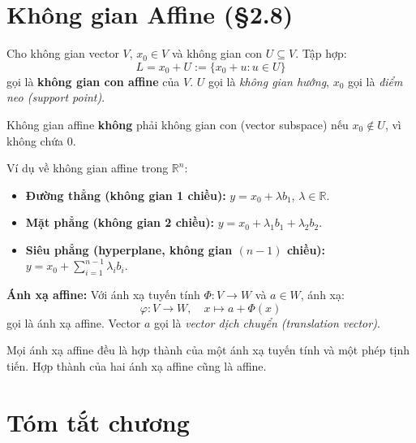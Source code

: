 \documentclass[12pt,a4paper]{article}
\begin{document}
\section{Không gian Affine (§2.8)}

\begin{dinhnghia}
Cho không gian vector $V$, $x_0 \in V$ và không gian con $U \subseteq V$. Tập hợp:
\[
  L = x_0 + U := \{x_0 + u : u \in U\}
\]
gọi là \textbf{không gian con affine} của $V$. $U$ gọi là \emph{không gian hướng}, $x_0$ gọi là \emph{điểm neo (support point)}.
\end{dinhnghia}

\begin{luuy}
Không gian affine \textbf{không} phải không gian con (vector subspace) nếu $x_0 \notin U$, vì không chứa $0$.
\end{luuy}

Ví dụ về không gian affine trong $\mathbb{R}^n$:
\begin{itemize}
  \item \textbf{Đường thẳng (không gian 1 chiều):} $y = x_0 + \lambda b_1$, $\lambda \in \mathbb{R}$.
  \item \textbf{Mặt phẳng (không gian 2 chiều):} $y = x_0 + \lambda_1 b_1 + \lambda_2 b_2$.
  \item \textbf{Siêu phẳng (hyperplane, không gian $(n-1)$ chiều):} $y = x_0 + \sum_{i=1}^{n-1} \lambda_i b_i$.
\end{itemize}

\begin{dinhnghia}
\textbf{Ánh xạ affine:} Với ánh xạ tuyến tính $\Phi : V \to W$ và $a \in W$, ánh xạ:
\[
  \varphi : V \to W,\quad x \mapsto a + \Phi(x)
\]
gọi là ánh xạ affine. Vector $a$ gọi là \emph{vector dịch chuyển (translation vector)}.
\end{dinhnghia}

\begin{luuy}
Mọi ánh xạ affine đều là hợp thành của một ánh xạ tuyến tính và một phép tịnh tiến. Hợp thành của hai ánh xạ affine cũng là affine.
\end{luuy}

\section{Tóm tắt chương}
\end{document}

